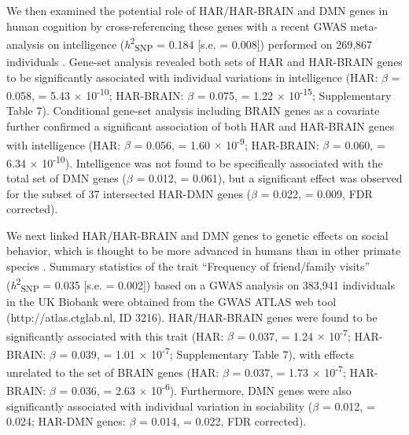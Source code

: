 \begin{refsection}
We then examined the potential role of HAR/HAR-BRAIN and DMN genes in human cognition by cross-referencing these genes with a recent GWAS meta-analysis on intelligence (\textit{h}\textsuperscript{2}\textsubscript{SNP} = 0.184 [s.e. = 0.008]) performed on 269,867 individuals \citep{Savage2018GenomewideAM}. Gene-set analysis \citep{de2015magma} revealed both sets of HAR and HAR-BRAIN genes to be significantly associated with individual variations in intelligence (HAR: $\beta$ = 0.058, \pval = 5.43 $\times$ 10\textsuperscript{-10}; HAR-BRAIN: $\beta$ = 0.075, \pval = 1.22 $\times$ 10\textsuperscript{-15}; Supplementary Table 7). Conditional gene-set analysis \citep{de2018conditional} including BRAIN genes as a covariate further confirmed a significant association of both HAR and HAR-BRAIN genes with intelligence (HAR: $\beta$ = 0.056, \pval = 1.60 $\times$ 10\textsuperscript{-9}; HAR-BRAIN: $\beta$ = 0.060, \pval = 6.34 $\times$ 10\textsuperscript{-10}). Intelligence was not found to be specifically associated with the total set of DMN genes ($\beta$ = 0.012, \pval = 0.061), but a significant effect was observed for the subset of 37 intersected HAR-DMN genes ($\beta$ = 0.022, \pval = 0.009, FDR corrected).

We next linked HAR/HAR-BRAIN and DMN genes to genetic effects on social behavior, which is thought to be more advanced in humans than in other primate species \citep{tomasello2010ape}. Summary statistics of the trait “Frequency of friend/family visits” (\textit{h}\textsuperscript{2}\textsubscript{SNP} = 0.035 [s.e. = 0.002]) based on a GWAS analysis on 383,941 individuals in the UK Biobank were obtained from the GWAS ATLAS web tool \citep{Watanabe2019AGO} (http://atlas.ctglab.nl, ID 3216). HAR/HAR-BRAIN genes were found to be significantly associated with this trait (HAR: $\beta$ = 0.037, \pval = 1.24 $\times$ 10\textsuperscript{-7}; HAR-BRAIN: $\beta$ = 0.039, \pval = 1.01 $\times$ 10\textsuperscript{-7}; Supplementary Table 7), with effects unrelated to the set of BRAIN genes (HAR: $\beta$ = 0.037, \pval = 1.73 $\times$ 10\textsuperscript{-7}; HAR-BRAIN: $\beta$ = 0.036, \pval = 2.63 $\times$ 10\textsuperscript{-6}). Furthermore, DMN genes were also significantly associated with individual variation in sociability ($\beta$ = 0.012, \pval = 0.024; HAR-DMN genes: $\beta$ = 0.014, \pval = 0.022, FDR corrected).


\end{refsection}
